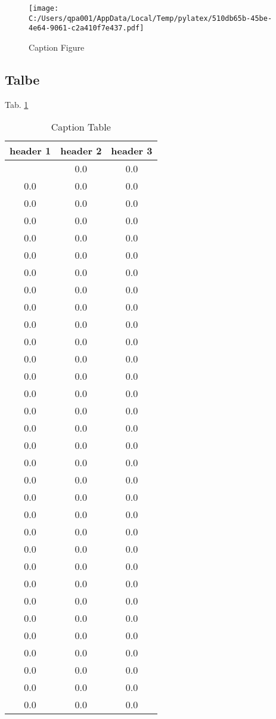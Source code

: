 \documentclass{article}%
\begin{document}
\begin{figure}[h!]%
\centering%
\texttt{[image: C:/Users/qpa001/AppData/Local/Temp/pylatex/510db65b-45be-4e64-9061-c2a410f7e437.pdf]}%
\caption{Caption Figure}%
\label{figure:fig1}%
\end{figure}

%
\subsection{Talbe}%
\label{subsec:Talbe}%
Tab. \ref{table:tab1}%
\begin{longtable}{|c|c|c|}%
\caption{Caption Table}%
\label{table:tab1}\\%
\hline%
header 1&header 2&header 3\\%
\hline%
\endhead%
\hline%
\endfoot%
\hline%
\endlastfoot%
0.0&0.0&0.0\\%
0.0&0.0&0.0\\%
0.0&0.0&0.0\\%
0.0&0.0&0.0\\%
0.0&0.0&0.0\\%
0.0&0.0&0.0\\%
0.0&0.0&0.0\\%
0.0&0.0&0.0\\%
0.0&0.0&0.0\\%
0.0&0.0&0.0\\%
0.0&0.0&0.0\\%
0.0&0.0&0.0\\%
0.0&0.0&0.0\\%
0.0&0.0&0.0\\%
0.0&0.0&0.0\\%
0.0&0.0&0.0\\%
0.0&0.0&0.0\\%
0.0&0.0&0.0\\%
0.0&0.0&0.0\\%
0.0&0.0&0.0\\%
0.0&0.0&0.0\\%
0.0&0.0&0.0\\%
0.0&0.0&0.0\\%
0.0&0.0&0.0\\%
0.0&0.0&0.0\\%
0.0&0.0&0.0\\%
0.0&0.0&0.0\\%
0.0&0.0&0.0\\%
0.0&0.0&0.0\\%
0.0&0.0&0.0\\%
0.0&0.0&0.0\\%
0.0&0.0&0.0\\%

\end{longtable}
\end{document}
